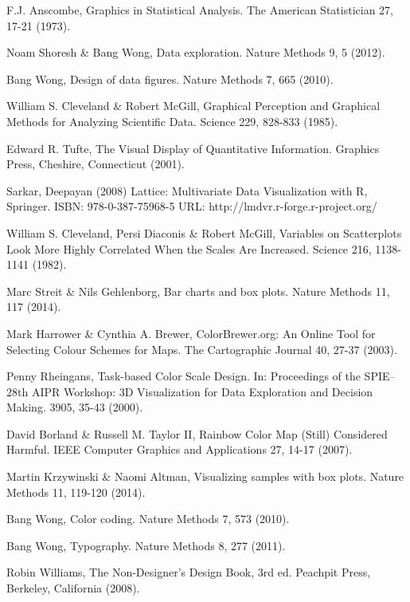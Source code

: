 \documentclass[letterpaper]{article}
\begin{document}
\begin{thebibliography}{1}
F.J. Anscombe, Graphics in Statistical Analysis. The American Statistician 27, 17-21 (1973).

Noam Shoresh \& Bang Wong, Data exploration. Nature Methods 9, 5 (2012).

Bang Wong, Design of data figures. Nature Methods 7, 665 (2010).

William S. Cleveland \& Robert McGill, Graphical Perception and Graphical Methods for Analyzing Scientific Data. Science 229, 828-833 (1985).

Edward R. Tufte, The Visual Display of Quantitative Information. Graphics Press, Cheshire, Connecticut (2001).

Sarkar, Deepayan (2008) Lattice: Multivariate Data Visualization with R, Springer.  ISBN: 978-0-387-75968-5 URL: http://lmdvr.r-forge.r-project.org/

William S. Cleveland, Persi Diaconis \& Robert McGill, Variables on Scatterplots Look More Highly Correlated When the Scales Are Increased. Science 216, 1138-1141 (1982).

Marc Streit \& Nils Gehlenborg, Bar charts and box plots. Nature Methods 11, 117 (2014).

Mark Harrower \& Cynthia A. Brewer, ColorBrewer.org: An Online Tool for Selecting Colour Schemes for Maps. The Cartographic Journal 40, 27-37 (2003).

Penny Rheingans, Task-based Color Scale Design. In: Proceedings of the SPIE--28th AIPR Workshop: 3D Visualization for Data Exploration and Decision Making. 3905, 35-43 (2000).

David Borland \& Russell M. Taylor II, Rainbow Color Map (Still) Considered Harmful. IEEE Computer Graphics and Applications 27, 14-17 (2007).

Martin Krzywinski \& Naomi Altman, Visualizing samples with box plots. Nature Methods 11, 119-120 (2014).

Bang Wong, Color coding. Nature Methods 7, 573 (2010).

Bang Wong, Typography. Nature Methods 8, 277 (2011).

Robin Williams, The Non-Designer's Design Book, 3rd ed. Peachpit Press, Berkeley, California (2008).


\end{thebibliography}
\end{document}
